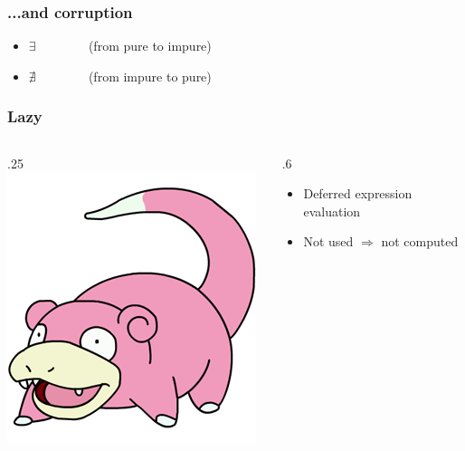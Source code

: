 \documentclass[17pt]{beamer}
\renewcommand{\(}[1]{\begin{columns}[#1]}
\renewcommand{\)}{\end{columns}}
\newcommand{\<}[1]{\begin{column}{#1}}
\renewcommand{\>}{\end{column}}
\begin{document}
\begin{frame}[fragile]
  \frametitle{...and corruption}
  \begin{itemize}
  \item $\exists$ ~~ ~~~~~{\small (from pure to impure)}
  \item $\nexists$ ~~ ~~~~~{\small (from impure to pure)}
  \end{itemize}

  \begin{center}
  \end{center}
\end{frame}

\begin{frame}
  \frametitle{Lazy}
  \({c}
  \<{.25\textwidth}
  \includegraphics[width=\textwidth]{img/slowpoke}
  \>
  \<{.6\textwidth}
  \begin{itemize}
  \item Deferred expression evaluation
  \item Not used $\Rightarrow$ not computed
  \end{itemize}
  \>
  \)
  \pause
  ~\\
  \begin{center}
    \Large
  \end{center}
\end{frame}
\end{document}
